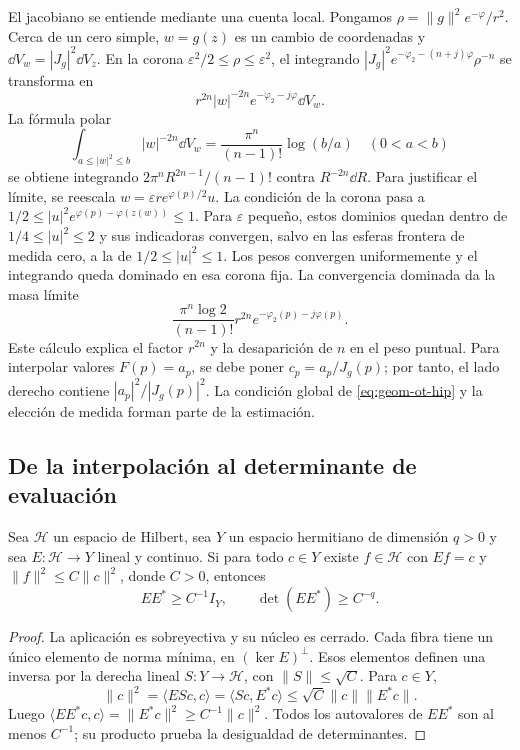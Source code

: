 El jacobiano se entiende mediante una cuenta local.
Pongamos $\rho=\|g\|^2e^{-\varphi}/r^2$.
Cerca de un cero simple, $w=g(z)$ es un cambio de coordenadas y
$\dd V_w=|J_g|^2\dd V_z$.
En la corona $\varepsilon^2/2\le\rho\le\varepsilon^2$,
el integrando
$|J_g|^2e^{-\varphi_2-(n+j)\varphi}\rho^{-n}$
se transforma en
\[
 r^{2n}|w|^{-2n}e^{-\varphi_2-j\varphi}\dd V_w.
\]
La fórmula polar
\begin{equation}
 \int_{a\le|w|^2\le b}|w|^{-2n}\dd V_w
                  =\frac{\pi^n}{(n-1)!}\log(b/a)
 \quad(0<a<b)
 \label{eq:geom-corona}
\end{equation}
se obtiene integrando
$2\pi^nR^{2n-1}/(n-1)!$ contra $R^{-2n}\dd R$.
Para justificar el límite, se reescala
$w=\varepsilon r e^{\varphi(p)/2}u$.
La condición de la corona pasa a
$1/2\le|u|^2e^{\varphi(p)-\varphi(z(w))}\le1$.
Para $\varepsilon$ pequeño, estos dominios quedan dentro de
$1/4\le|u|^2\le2$ y sus indicadoras convergen, salvo en las
esferas frontera de medida cero, a la de
$1/2\le|u|^2\le1$.
Los pesos convergen uniformemente y el integrando queda dominado
en esa corona fija. La convergencia dominada da la masa límite
\[
 \frac{\pi^n\log2}{(n-1)!}
                 r^{2n}e^{-\varphi_2(p)-j\varphi(p)}.
\]
Este cálculo explica el factor $r^{2n}$ y la desaparición de
$n$ en el peso puntual. Para interpolar valores $F(p)=a_p$,
se debe poner $c_p=a_p/J_g(p)$; por tanto, el lado derecho
contiene $|a_p|^2/|J_g(p)|^2$.
La condición global de \eqref{eq:geom-ot-hip} y la elección
de medida forman parte de la estimación.

\subsection{De la interpolación al determinante de evaluación}

\begin{lema}
Sea $\mathcal H$ un espacio de Hilbert, sea $Y$ un espacio
hermitiano de dimensión $q>0$ y sea
$E:\mathcal H\to Y$ lineal y continuo.
Si para todo $c\in Y$ existe $f\in\mathcal H$ con
$Ef=c$ y $\|f\|^2\le C\|c\|^2$, donde $C>0$, entonces
\begin{equation}
                 EE^*\ge C^{-1}I_Y,\qquad
                 \det(EE^*)\ge C^{-q}.
 \label{eq:geom-eval-gram}
\end{equation}
\label{lem:geom-eval-gram}
\end{lema}

\begin{proof}
La aplicación es sobreyectiva y su núcleo es cerrado.
Cada fibra tiene un único elemento de norma mínima, en
$(\ker E)^\perp$. Esos elementos definen una inversa por
la derecha lineal $S:Y\to\mathcal H$, con $\|S\|\le\sqrt C$.
Para $c\in Y$,
\[
 \|c\|^2=\langle ESc,c\rangle
        =\langle Sc,E^*c\rangle
        \le\sqrt C\|c\|\|E^*c\|.
\]
Luego $\langle EE^*c,c\rangle=\|E^*c\|^2
\ge C^{-1}\|c\|^2$.
Todos los autovalores de $EE^*$ son al menos $C^{-1}$;
su producto prueba la desigualdad de determinantes.
\end{proof}

